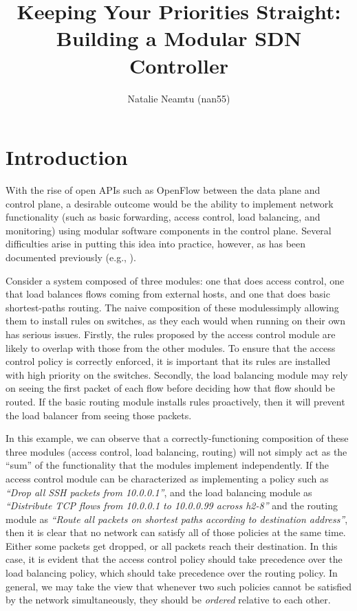 \documentclass{article}
\title{Keeping Your Priorities Straight: \\
\large Building a Modular SDN Controller}
\author{Natalie Neamtu (nan55)}
\begin{document}
\maketitle

\section{Introduction}

With the rise of open APIs such as OpenFlow \cite{openflow} between the data plane and 
control plane, a desirable outcome would be the ability to implement 
network functionality (such as basic forwarding, access control, 
load balancing, and monitoring) using modular software components in the
control plane. Several difficulties arise in putting this idea into practice,
however, as has been documented previously (e.g., \cite{frenetic2, pyretic}). 

Consider a system composed of three modules: one that does access control,
one that load balances flows coming from external hosts, and one that does
basic shortest-paths routing.
The naive composition of these modules\textemdash simply allowing them to 
install rules on switches, as they each would when running on their own\textemdash 
has serious issues.
Firstly, the rules proposed by the access control module are likely to overlap
with those from the other modules.
To ensure that the access control policy is correctly enforced, it is important
that its rules are installed with high priority on the switches.
Secondly, the load balancing module may rely on seeing the first packet of
each flow before deciding how that flow should be routed.
If the basic routing module installs rules proactively, then it will
prevent the load balancer from seeing those packets.

In this example, we can observe that a correctly-functioning 
composition of these three modules (access control, load balancing, routing) 
will not simply act as the ``sum'' of the functionality that the modules implement
independently. 
If the access control module can be characterized as implementing
a policy such as \emph{``Drop all SSH packets from 10.0.0.1''}, 
and the load balancing module as 
\emph{``Distribute TCP flows from 10.0.0.1 to 10.0.0.99 across h2-8''}
and the routing module as 
\emph{``Route all packets on shortest paths according to destination address''}, 
then it is clear that no network can satisfy all of those policies at the same time. 
Either some packets get dropped, or all packets reach their destination.
In this case, it is evident that the access control policy should take
precedence over the load balancing policy, which should take precedence over
the routing policy. 
In general, we may take the view that whenever two such policies 
cannot be satisfied by the network simultaneously,
they should be \emph{ordered} relative to each other. 
\end{document}
